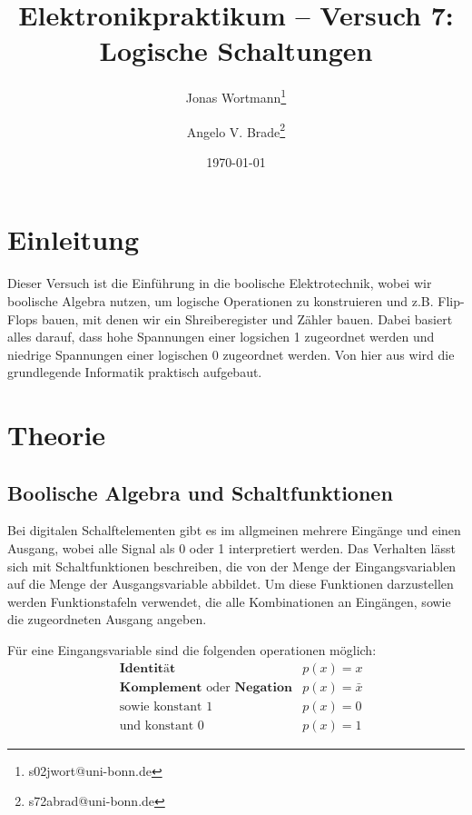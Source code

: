 \documentclass[10pt]{article}
\title{Elektronikpraktikum -- Versuch 7: Logische Schaltungen}
\author[1]{Jonas Wortmann\thanks{s02jwort@uni-bonn.de}}
\author[1]{Angelo V. Brade\thanks{s72abrad@uni-bonn.de}}
\affil[1]{Rheinische Friedrich-Wilhelms-Universität Bonn}
\date{\today}
\begin{document}
\maketitle
\newpage

\tableofcontents
\newpage


\pagestyle{fancy}
\fancyhead[R]{\thepage}
\fancyhead[L]{\leftmark}


\begin{multicols}{2}
	\section{Einleitung}
  Dieser Versuch ist die Einführung in die boolische Elektrotechnik, wobei wir boolische Algebra nutzen, um logische Operationen zu konstruieren und z.B. Flip-Flops bauen, mit denen wir ein Shreiberegister und Zähler bauen. Dabei basiert alles darauf, dass hohe Spannungen einer logsichen 1 zugeordnet werden und niedrige Spannungen einer logischen 0 zugeordnet werden. Von hier aus wird die grundlegende Informatik praktisch aufgebaut.

	\section{Theorie}
	\subsection{Boolische Algebra und Schaltfunktionen}
	Bei digitalen Schalftelementen gibt es im allgmeinen mehrere Eingänge und einen Ausgang, wobei alle Signal als 0 oder 1 interpretiert werden. Das Verhalten lässt sich mit Schaltfunktionen beschreiben, die von der Menge der Eingangsvariablen auf die Menge der Ausgangsvariable abbildet. Um diese Funktionen darzustellen werden Funktionstafeln verwendet, die alle Kombinationen an Eingängen, sowie die zugeordneten Ausgang angeben.

	Für eine Eingangsvariable sind die folgenden operationen möglich:
	\begin{align*}
		 & \textbf{Identität}                                  & p(x) = x       \\
		 & \textbf{Komplement} \text{ oder } \textbf{Negation} & p(x) = \bar{x} \\
		 & \text{sowie konstant 1}                             & p(x) = 0       \\
		 & \text{und konstant 0}                               & p(x) = 1
	\end{align*}


\end{multicols}
\end{document}
